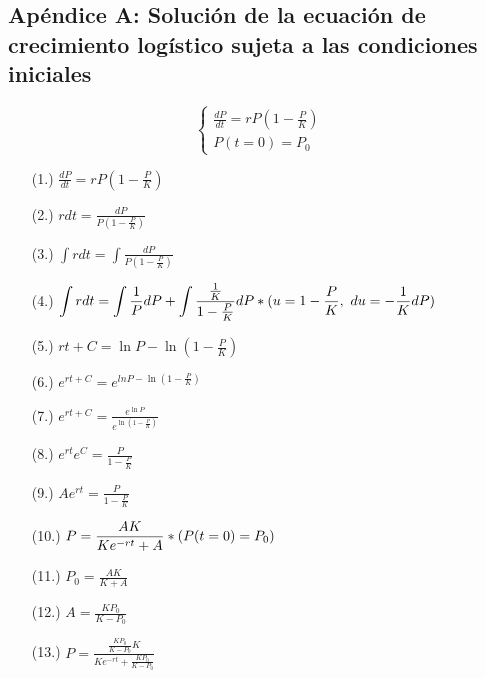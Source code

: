 \begin{appendixes}
    \section{Ap\'endice A: Soluci\'on de la ecuaci\'on de crecimiento log\'istico sujeta a las condiciones iniciales}
    \label{app-a}
    
    \begin{equation*}
    \boxed{\left\lbrace
        \begin{array}{l}		
            \displaystyle\frac{dP}{dt} = rP(1-\displaystyle\frac{P}{K})\\
            P(t=0)=P_0
        \end{array}
    \right.}
    \end{equation*}
    
    \begin{minipage}[t]{0.45\textwidth}
    \begin{enumerate}
    \item [(1.)] $\displaystyle \frac{dP}{dt} = rP(1-\frac{P}{K})$
    \item [(2.)] $\displaystyle rdt = \frac{dP}{P(1-\frac{P}{K})}$
    \item [(3.)] $\displaystyle \int rdt = \int \frac{dP}{P(1-\frac{P}{K})}$
    \item [(4.)] $\displaystyle \int rdt = \int \frac{1}{P}dP + \int \frac{\frac{1}{K}}{1-\frac{P}{K}}dP \\ *(\displaystyle u=1-\frac{P}{K},~\displaystyle du=-\frac{1}{K}dP)$
    \item [(5.)] $\displaystyle rt+C = \ln P - \ln(1-\frac{P}{K})$
    \item [(6.)] $\displaystyle e^{rt+C} = e^{lnP - \ln(1-\frac{P}{K})}$
    \item [(7.)] $\displaystyle e^{rt+C} = \frac{e^{\ln P}}{e^{\ln(1-\frac{P}{K})}}$
    \end{enumerate}
    \end{minipage} \hfill 
    \begin{minipage}[t]{0.45\textwidth}
    \begin{enumerate}
    \item [(8.)] $\displaystyle e^{rt}e^C = \frac{P}{1-\frac{P}{K}}$
    \item [(9.)] $\displaystyle Ae^{rt} = \frac{P}{1-\frac{P}{K}}$
    \item [(10.)] $\displaystyle P = \frac{AK}{Ke^{-rt}+A} \\ *(P(t=0)=P_0)$
    \item [(11.)] $\displaystyle P_0 = \frac{AK}{K+A}$
    \item [(12.)] $\displaystyle A = \frac{K P_0}{K-P_0}$
    \item [(13.)] $\displaystyle P = \frac{\frac{K P_0}{K-P_0}K}{Ke^{-rt}+\frac{K P_0}{K-P_0}}$
    \end{enumerate}
    \end{minipage}
    

\end{appendixes}
